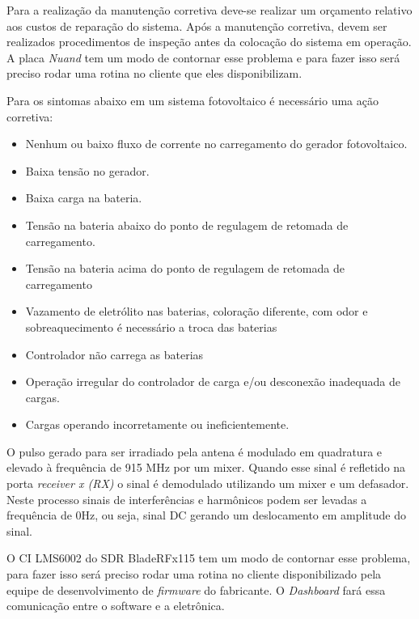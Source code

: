 Para a realização da manutenção corretiva deve-se realizar um orçamento relativo aos custos de reparação do sistema. Após a manutenção corretiva, devem ser realizados procedimentos de inspeção antes da colocação do sistema em operação.
A placa \textit{Nuand} tem um modo de contornar esse problema e para fazer isso será preciso rodar uma rotina no cliente que eles disponibilizam. 

Para os sintomas abaixo em um sistema fotovoltaico é necessário uma ação corretiva:
\begin{itemize}
    \item Nenhum ou baixo fluxo de corrente no carregamento do gerador fotovoltaico.
    \item Baixa tensão no gerador.
    \item Baixa carga na bateria.
    \item Tensão na bateria abaixo do ponto de regulagem de retomada de carregamento.
    \item Tensão na bateria acima do ponto de regulagem de retomada de carregamento
    \item Vazamento de eletrólito nas baterias, coloração diferente, com odor e
sobreaquecimento é necessário a troca das baterias
    \item Controlador não carrega as baterias
    \item Operação irregular do controlador de carga e/ou desconexão inadequada de cargas.
    \item Cargas operando incorretamente ou ineficientemente. 
\end{itemize}


O pulso gerado para ser irradiado pela antena é modulado em quadratura e elevado à frequência de 915 MHz por um mixer. Quando esse sinal é refletido na porta \emph{receiver x (RX)} o sinal é demodulado utilizando um mixer e um defasador. Neste processo sinais de interferências e harmônicos podem ser levadas a frequência de 0Hz, ou seja, sinal DC gerando um deslocamento em amplitude do sinal.

O CI LMS6002 do SDR BladeRFx115 tem um modo de contornar esse problema, para fazer isso será preciso rodar uma rotina no cliente  disponibilizado pela equipe de desenvolvimento de \emph{firmware} do fabricante. O  \textit{Dashboard} fará essa comunicação entre o software e a eletrônica. 

